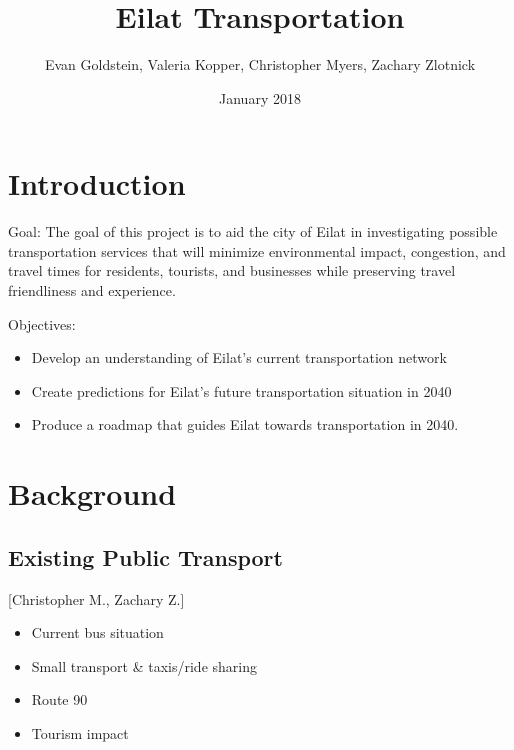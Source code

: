 \documentclass[12pt]{article}                         %
\title{Eilat Transportation}
\author{Evan Goldstein, Valeria Kopper, Christopher Myers, Zachary Zlotnick}
\date{January 2018}
\begin{document}
\maketitle
\newpage

\renewcommand\abstractname{Summary} %

\tableofcontents
\newpage
\listofauthorships
\newpage
{}
\doublespacing

\section{Introduction}

Goal: The goal of this project is to aid the city of Eilat in investigating possible transportation services that will minimize environmental impact, congestion, and travel times for residents, tourists, and businesses while preserving travel friendliness and experience.

Objectives:
\begin{itemize}
    \item Develop an understanding of Eilat's current transportation network
    
    \item Create predictions for Eilat's future transportation situation in 2040
    
    \item Produce a roadmap that guides Eilat towards transportation in 2040.
\end{itemize}

\newpage
\section{Background}

\subsection{Existing Public Transport}[Christopher M., Zachary Z.]
\begin{itemize}
    \item Current bus situation
    \item Small transport \& taxis/ride sharing
    \item Route 90
    \item Tourism impact
\end{itemize}
\end{document}
